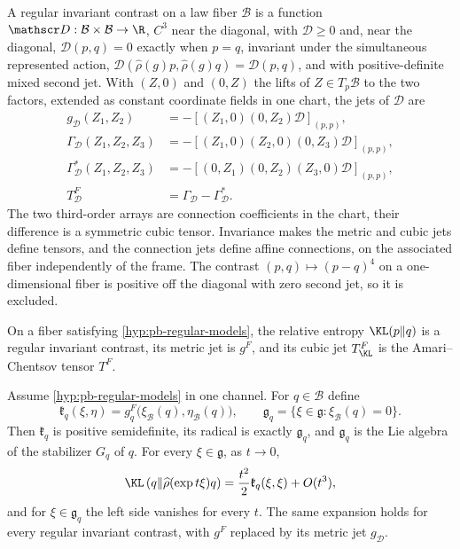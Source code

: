 A regular invariant contrast on a law fiber $\mathcal B$ is a function
$\mathscr D:\mathcal B\times\mathcal B\to\R$, $C^3$ near the diagonal, with
$\mathscr D\geq0$ and, near the diagonal, $\mathscr D(p,q)=0$ exactly when $p=q$,
invariant under the simultaneous represented action,
$\mathscr D(\widehat\rho(g)p,\widehat\rho(g)q)=\mathscr D(p,q)$, and with
positive-definite mixed second jet.  With $(Z,0)$ and $(0,Z)$ the lifts of
$Z\in T_p\mathcal B$ to the two factors, extended as constant coordinate fields in one
chart, the jets of $\mathscr D$ are
\begin{align}
g_{\mathscr D}(Z_1,Z_2)
&=-[(Z_1,0)(0,Z_2)\mathscr D]_{(p,p)},
\label{eq:pb-divergence-metric-jet}\\
\Gamma_{\mathscr D}(Z_1,Z_2,Z_3)
&=-[(Z_1,0)(Z_2,0)(0,Z_3)\mathscr D]_{(p,p)},
\label{eq:pb-divergence-first-connection-jet}\\
\Gamma_{\mathscr D}^*(Z_1,Z_2,Z_3)
&=-[(0,Z_1)(0,Z_2)(Z_3,0)\mathscr D]_{(p,p)},
\label{eq:pb-divergence-dual-connection-jet}\\
T^F_{\mathscr D}
&=\Gamma_{\mathscr D}-\Gamma_{\mathscr D}^*.
\label{eq:pb-divergence-amari-jet}
\end{align}
The two third-order arrays are connection coefficients in the chart, their difference is
a symmetric cubic tensor. Invariance makes the metric and cubic jets define tensors,
and the connection jets define affine connections, on the associated fiber
independently of the frame.  The contrast $(p,q)\mapsto(p-q)^4$
on a one-dimensional fiber is positive off the diagonal with zero second jet, so it is
excluded.

On a fiber satisfying \cref{hyp:pb-regular-models}, the relative entropy
$\KL(p\Vert q)$ is a regular invariant contrast, its metric jet is $g^F$, and its cubic
jet $T^F_{\KL}$ is the Amari--Chentsov tensor $T^F$.  

Assume \cref{hyp:pb-regular-models} in one channel.  For $q\in\mathcal B$ define
\begin{equation}
\mathfrak k_q(\xi,\eta)=g^F_q\bigl(\xi_{\mathcal B}(q),\eta_{\mathcal B}(q)\bigr),
\qquad
\mathfrak g_q=\{\xi\in\mathfrak g:\xi_{\mathcal B}(q)=0\}.
\label{eq:pb-orbit-fisher-form}
\end{equation}
Then $\mathfrak k_q$ is positive semidefinite, its radical is exactly $\mathfrak g_q$,
and $\mathfrak g_q$ is the Lie algebra of the stabilizer $G_q$ of $q$.  For every
$\xi\in\mathfrak g$, as $t\to0$,
\begin{equation}
\KL\left(q\Vert\widehat\rho(\exp t\xi)q\right)
=\frac{t^2}{2}\mathfrak k_q(\xi,\xi)+O(t^3),
\label{eq:pb-orbit-kl-expansion}
\end{equation}
and for $\xi\in\mathfrak g_q$ the left side vanishes for every $t$.  The same expansion
holds for every regular invariant contrast, with $g^F$ replaced by its metric jet
$g_{\mathscr D}$.  

